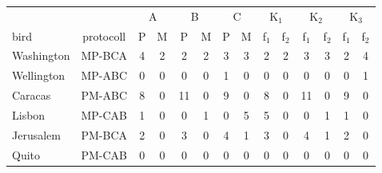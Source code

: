 \begin{tabular}{l|c|cccccc||cccccc}
 \multicolumn{2}{c|}{} & \multicolumn{2}{c}{A} &
    \multicolumn{2}{c}{B} & \multicolumn{2}{c||}{C} &
    \multicolumn{2}{c}{K$_1$}  & \multicolumn{2}{c}{K$_2$} &
    \multicolumn{2}{c}{K$_3$} \\bird & protocoll & P & M & P & M & P & M & f$_1$ & f$_2$  & f$_1$  & f$_2$  & f$_1$  & f$_2$
          \\\midrule
Washington & MP-BCA & 4 & 2 & 2 & 2 & 3 & 3 & 2 & 2 & 3 & 3 & 2 & 4 \\
Wellington & MP-ABC & 0 & 0 & 0 & 0 & 1 & 0 & 0 & 0 & 0 & 0 & 0 & 1 \\
Caracas & PM-ABC & 8 & 0 & 11 & 0 & 9 & 0 & 8 & 0 & 11 & 0 & 9 & 0 \\
Lisbon & MP-CAB & 1 & 0 & 0 & 1 & 0 & 5 & 5 & 0 & 0 & 1 & 1 & 0 \\
Jerusalem & PM-BCA & 2 & 0 & 3 & 0 & 4 & 1 & 3 & 0 & 4 & 1 & 2 & 0 \\
Quito & PM-CAB & 0 & 0 & 0 & 0 & 0 & 0 & 0 & 0 & 0 & 0 & 0 & 0 \\
\end{tabular}